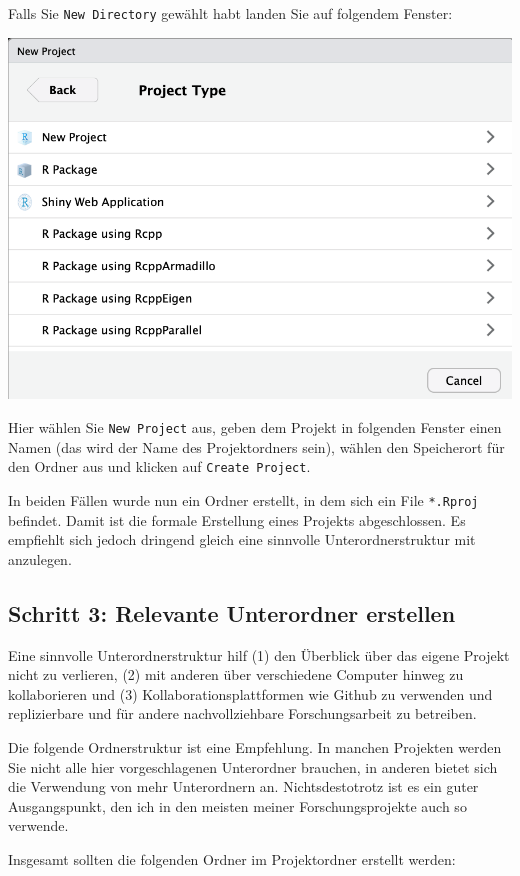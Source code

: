 \documentclass[]{book}
\begin{document}
Falls Sie \texttt{New\ Directory} gewählt habt landen Sie auf folgendem
Fenster:

\begin{center}\includegraphics[width=0.6\linewidth]{figures/r-studio-new-project-new-dir} \end{center}

Hier wählen Sie \texttt{New\ Project} aus, geben dem Projekt in
folgenden Fenster einen Namen (das wird der Name des Projektordners
sein), wählen den Speicherort für den Ordner aus und klicken auf
\texttt{Create\ Project}.

In beiden Fällen wurde nun ein Ordner erstellt, in dem sich ein File
\texttt{*.Rproj} befindet. Damit ist die formale Erstellung eines
Projekts abgeschlossen. Es empfiehlt sich jedoch dringend gleich eine
sinnvolle Unterordnerstruktur mit anzulegen.

\hypertarget{unterordner}{\subsection{Schritt 3: Relevante Unterordner
erstellen}\label{unterordner}}

Eine sinnvolle Unterordnerstruktur hilf (1) den Überblick über das
eigene Projekt nicht zu verlieren, (2) mit anderen über verschiedene
Computer hinweg zu kollaborieren und (3) Kollaborationsplattformen wie
Github zu verwenden und replizierbare und für andere nachvollziehbare
Forschungsarbeit zu betreiben.

Die folgende Ordnerstruktur ist eine Empfehlung. In manchen Projekten
werden Sie nicht alle hier vorgeschlagenen Unterordner brauchen, in
anderen bietet sich die Verwendung von mehr Unterordnern an.
Nichtsdestotrotz ist es ein guter Ausgangspunkt, den ich in den meisten
meiner Forschungsprojekte auch so verwende.

Insgesamt sollten die folgenden Ordner im Projektordner erstellt werden:
\end{document}
